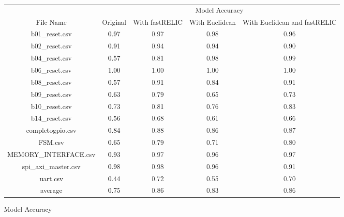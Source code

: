 \begin{tabular}{|c|c|c|c|c|}
    \hline
     & \multicolumn{4}{c|}{Model Accuracy}\\
    \cline {2-5}
    File Name & Original & With fastRELIC & With Euclidean & With Euclidean and fastRELIC\\
    \hline
    \hline
    b01\_reset.csv & 0.97 & 0.97 & 0.98 & 0.96\\
    \hline
    b02\_reset.csv & 0.91 & 0.94 & 0.94 & 0.90\\
    \hline
    b04\_reset.csv & 0.57 & 0.81 & 0.98 & 0.99\\
    \hline
    b06\_reset.csv & 1.00 & 1.00 & 1.00 & 1.00\\
    \hline
    b08\_reset.csv & 0.57 & 0.91 & 0.84 & 0.91\\
    \hline
    b09\_reset.csv & 0.63 & 0.79 & 0.65 & 0.73\\
    \hline
    b10\_reset.csv & 0.73 & 0.81 & 0.76 & 0.83\\
    \hline
    b14\_reset.csv & 0.56 & 0.68 & 0.61 & 0.66\\
    \hline
    completogpio.csv & 0.84 & 0.88 & 0.86 & 0.87\\
    \hline
    FSM.csv & 0.65 & 0.79 & 0.71 & 0.80\\
    \hline
    MEMORY\_INTERFACE.csv & 0.93 & 0.97 & 0.96 & 0.97\\
    \hline
    spi\_axi\_master.csv & 0.98 & 0.98 & 0.96 & 0.91\\
    \hline
    uart.csv & 0.44 & 0.72 & 0.55 & 0.70\\
    \hline
    \hline
    average & 0.75 & 0.86 & 0.83 & 0.86\\
    \hline
\end{tabular}
\caption{Model Accuracy}
\label{tab:Model Accuracy after Step Feature Selection}

